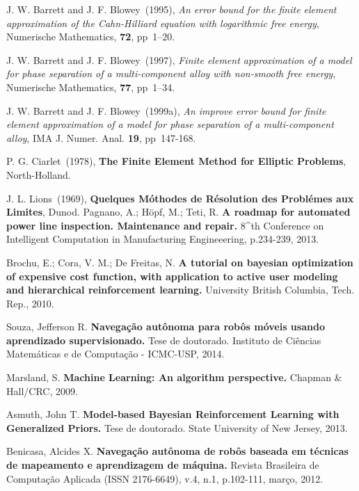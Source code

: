 \begin{thebibliography}{999}
J. W. Barrett and J. F. Blowey~(1995),  
{\it An error bound for the finite element approximation of the Cahn-Hilliard equation with logarithmic free energy}, 
Numerische Mathematics, 
{\bf 72}, pp~1--20.

J. W. Barrett and J. F. Blowey~(1997),  
{\it Finite element approximation of a model for phase separation of a multi-component alloy with non-smooth free energy}, 
Numerische Mathematics, 
{\bf 77}, pp~1--34.

J. W. Barrett and J. F. Blowey~(1999a),  
{\it An improve error bound for finite element approximation of a
model for phase separation of a multi-component alloy}, 
IMA J. Numer. Anal.  
{\bf 19}, pp~147-168.

P. G. Ciarlet~(1978),
{\bf The Finite Element Method for Elliptic Problems}, 
North-Holland. 

J. L. Lions~(1969),
{\bf Quelques M\'othodes de R\'esolution
des Probl\'emes aux Limites}, 
Dunod.
Pagnano, A.; Höpf, M.; Teti, R. {\bf A roadmap for automated power line inspection. Maintenance and repair.} 8^th Conference on Intelligent Computation in Manufacturing Engineeering, p.234-239, 2013.

Brochu, E.; Cora, V. M.; De Freitas, N. {\bf A tutorial on bayesian optimization of expensive cost function, with application to active user modeling and hierarchical reinforcement learning.} University British Columbia, Tech. Rep., 2010.

Souza, Jefferson R. {\bf Navegação autônoma para robôs móveis usando aprendizado supervisionado.} Tese de doutorado. Instituto de Ciências Matemáticas e de Computação - ICMC-USP, 2014.

Marsland, S. {\bf Machine Learning: An algorithm perspective.} Chapman \& Hall/CRC, 2009.

Asmuth, John T. {\bf Model-based Bayesian Reinforcement Learning with Generalized Priors.} Tese de doutorado. State University of New Jersey, 2013.

Benicasa, Alcides X. {\bf Navegação autônoma de robôs baseada em técnicas de mapeamento e aprendizagem de máquina.} Revista Brasileira de Computação Aplicada (ISSN 2176-6649), v.4, n.1, p.102-111, março, 2012.


\end{thebibliography}
